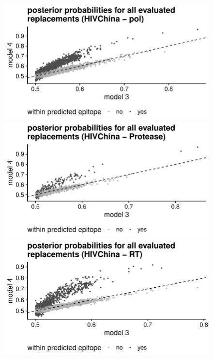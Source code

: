 \documentclass[a4paper,11pt]{article}
\begin{document}
\begin{figure}[H]
    \begin{minipage}{.49\textwidth}
      \includegraphics[width=\linewidth]{plots/posterior_p/hiv_china/pol.pdf}
    \end{minipage}
    \begin{minipage}{.49\textwidth}
        \includegraphics[width=\linewidth]{plots/posterior_p/hiv_china/protease.pdf}
    \end{minipage}
    
    \vspace{0.5cm}

    \begin{minipage}{.49\textwidth}
        \includegraphics[width=\linewidth]{plots/posterior_p/hiv_china/rt.pdf}  
    \end{minipage}
\end{figure}
\end{document}
